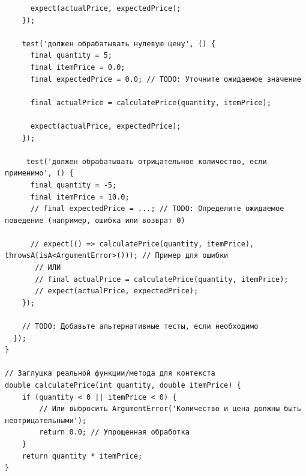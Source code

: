 \documentclass[14pt, russian]{scrartcl}
\begin{document}
\begin{verbatim}
      expect(actualPrice, expectedPrice);
    });

    test('должен обрабатывать нулевую цену', () {
      final quantity = 5;
      final itemPrice = 0.0;
      final expectedPrice = 0.0; // TODO: Уточните ожидаемое значение

      final actualPrice = calculatePrice(quantity, itemPrice);

      expect(actualPrice, expectedPrice);
    });

     test('должен обрабатывать отрицательное количество, если применимо', () {
      final quantity = -5;
      final itemPrice = 10.0;
      // final expectedPrice = ...; // TODO: Определите ожидаемое поведение (например, ошибка или возврат 0)

      // expect(() => calculatePrice(quantity, itemPrice), throwsA(isA<ArgumentError>())); // Пример для ошибки
       // ИЛИ
       // final actualPrice = calculatePrice(quantity, itemPrice);
       // expect(actualPrice, expectedPrice);
    });

    // TODO: Добавьте альтернативные тесты, если необходимо
  });
}

// Заглушка реальной функции/метода для контекста
double calculatePrice(int quantity, double itemPrice) {
    if (quantity < 0 || itemPrice < 0) {
        // Или выбросить ArgumentError('Количество и цена должны быть неотрицательными');
        return 0.0; // Упрощенная обработка
    }
    return quantity * itemPrice;
}
\end{verbatim}
\end{document}
